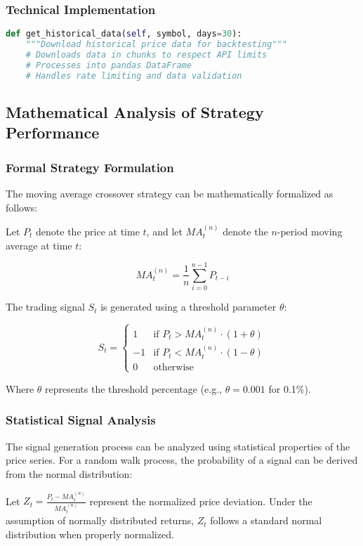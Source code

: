 \documentclass[12pt,a4paper]{article}
\begin{document}
\subsubsection{Technical Implementation}
\begin{lstlisting}[language=Python, caption=Backtesting Data Collection]
def get_historical_data(self, symbol, days=30):
    """Download historical price data for backtesting"""
    # Downloads data in chunks to respect API limits
    # Processes into pandas DataFrame
    # Handles rate limiting and data validation
\end{lstlisting}

\subsection{Mathematical Analysis of Strategy Performance}

\subsubsection{Formal Strategy Formulation}
The moving average crossover strategy can be mathematically formalized as follows:

Let \( P_t \) denote the price at time \( t \), and let \( MA_t^{(n)} \) denote the \( n \)-period moving average at time \( t \):

\[
MA_t^{(n)} = \frac{1}{n} \sum_{i=0}^{n-1} P_{t-i}
\]

The trading signal \( S_t \) is generated using a threshold parameter \( \theta \):

\[
S_t = \begin{cases}
1 & \text{if } P_t > MA_t^{(n)} \cdot (1 + \theta) \\
-1 & \text{if } P_t < MA_t^{(n)} \cdot (1 - \theta) \\
0 & \text{otherwise}
\end{cases}
\]

Where \( \theta \) represents the threshold percentage (e.g., \( \theta = 0.001 \) for 0.1\%).

\subsubsection{Statistical Signal Analysis}
The signal generation process can be analyzed using statistical properties of the price series. For a random walk process, the probability of a signal can be derived from the normal distribution:

Let \( Z_t = \frac{P_t - MA_t^{(n)}}{MA_t^{(n)}} \) represent the normalized price deviation. Under the assumption of normally distributed returns, \( Z_t \) follows a standard normal distribution when properly normalized.
\end{document}

